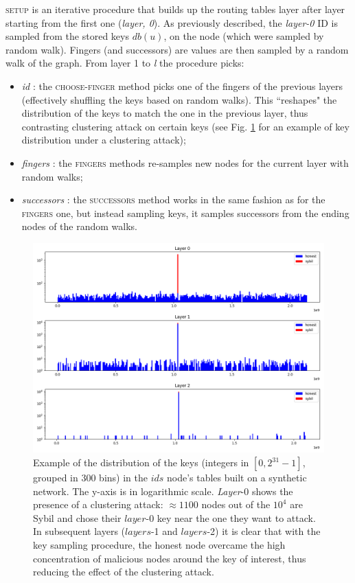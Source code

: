 \textsc{setup} is an iterative procedure that builds up the routing tables layer after layer starting from the first one (\textit{layer, 0}). As previously described, the \textit{layer-0} ID is sampled from the stored keys $db(u)$, on the node (which were sampled by random walk). Fingers (and successors) are values are then sampled by a random walk of the graph. From layer 1 to \textit{l} the procedure picks:
\begin{itemize}
    \item \textit{id} : the \textsc{choose-finger} method picks one of the fingers of the previous layers (effectively shuffling the keys based on random walks). This ``reshapes" the distribution of the keys to match the one in the previous layer, thus contrasting clustering attack on certain keys (see Fig. \ref{fig:key_distributions} for an example of key distribution under a clustering attack);
    \item \textit{fingers} : the \textsc{fingers} methods re-samples new nodes for the current layer  with random walks;
    \item \textit{successors} : the \textsc{successors} method works in the same fashion as for the \textsc{fingers} one, but instead sampling keys, it samples successors from the ending nodes of the random walks.
\end{itemize}

\begin{figure}[t]
    \centering
    \includegraphics[scale=0.4]{keys2.png}
    \caption{Example of the distribution of the keys (integers in $[0,2^{31}-1]$, grouped in 300 bins) in the $ids$ node's tables built on a synthetic network. The y-axis is in logarithmic scale. \textit{Layer}-0 shows the presence of a clustering attack: $\approx1100$ nodes out of the $10^4$ are Sybil and chose their $layer$-0 key near the one they want to attack. In subsequent layers ($layers$-1 and $layers$-2) it is clear that with the key sampling procedure, the honest node overcame the high concentration of malicious nodes around the key of interest, thus reducing the effect of the clustering attack.}
    \label{fig:key_distributions}
\end{figure}



